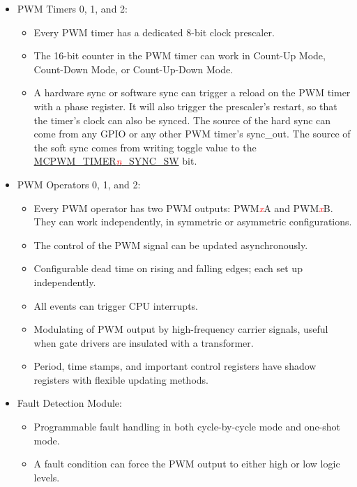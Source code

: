 \documentclass[main\_\_EN.tex]{subfiles}
\begin{document}
\begin{itemize}
    \item PWM Timers 0, 1, and 2:
        \begin{itemize}
            \item Every PWM timer has a dedicated 8-bit clock prescaler.
            \item The 16-bit counter in the PWM timer can work in Count-Up Mode, Count-Down Mode, or Count-Up-Down Mode.
            \item A hardware sync or software sync can trigger a reload on the PWM timer with a phase register. It will also trigger the prescaler's restart, so that the timer's clock can also be synced. The source of the hard sync can come from any GPIO or any other PWM timer's sync\_out. The source of the soft sync comes from writing toggle value to the \hyperref[fielddesc:MCPWMTIMERNSYNCSW]{MCPWM\_TIMER\textcolor{red}{\it{n}}\_SYNC\_SW} bit.
        \end{itemize}
    \item PWM Operators 0, 1, and 2:
        \begin{itemize}
            \item Every PWM operator has two PWM outputs: PWM\textcolor{red}{\it{x}}A and PWM\textcolor{red}{\it{x}}B. They can work independently, in symmetric or asymmetric configurations.
            \item The control of the PWM signal can be updated asynchronously.
            \item Configurable dead time on rising and falling edges; each set up independently.
            \item All events can trigger CPU interrupts.
            \item Modulating of PWM output by high-frequency carrier signals, useful when gate drivers are insulated with a transformer.
            \item Period, time stamps, and important control registers have shadow registers with flexible updating methods.
        \end{itemize}
    \item Fault Detection Module:
        \begin{itemize}
            \item Programmable fault handling in both cycle-by-cycle mode and one-shot mode.
            \item A fault condition can force the PWM output to either high or low logic levels.
        \end{itemize}

\end{itemize}
\end{document}
